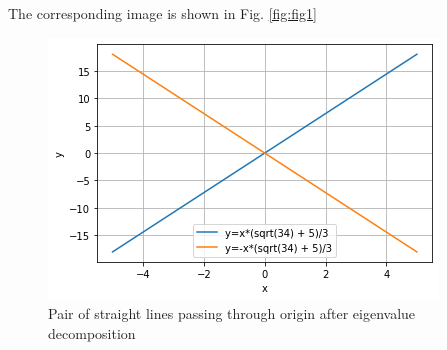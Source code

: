 \documentclass[journal,12pt,twocolumn]{IEEEtran}
\begin{document}
The corresponding image is shown in Fig. \ref{fig:fig1}
\renewcommand{\thefigure}{2}
\begin{figure}[h!]
    \centering
    \includegraphics[width=\columnwidth]{assignment3.1.png}
    \caption{Pair of straight lines passing through origin after eigenvalue decomposition}
    \label{fig:fig2}
\end{figure}
\end{document}

